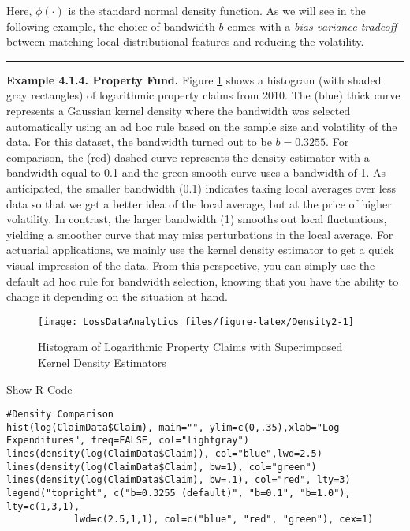 \documentclass[]{book}
\theoremstyle{definition}
\theoremstyle{definition}
\theoremstyle{definition}
\theoremstyle{remark}
\begin{document}
Here, \(\phi(\cdot)\) is the standard normal density function. As we
will see in the following example, the choice of bandwidth \(b\) comes
with a \emph{bias-variance tradeoff} between matching local
distributional features and reducing the volatility.

\begin{center}\rule{0.5\linewidth}{\linethickness}\end{center}

\textbf{Example 4.1.4. Property Fund.} Figure \ref{fig:Density2} shows a
histogram (with shaded gray rectangles) of logarithmic property claims
from 2010. The (blue) thick curve represents a Gaussian kernel density
where the bandwidth was selected automatically using an ad hoc rule
based on the sample size and volatility of the data. For this dataset,
the bandwidth turned out to be \(b=0.3255\). For comparison, the (red)
dashed curve represents the density estimator with a bandwidth equal to
0.1 and the green smooth curve uses a bandwidth of 1. As anticipated,
the smaller bandwidth (0.1) indicates taking local averages over less
data so that we get a better idea of the local average, but at the price
of higher volatility. In contrast, the larger bandwidth (1) smooths out
local fluctuations, yielding a smoother curve that may miss
perturbations in the local average. For actuarial applications, we
mainly use the kernel density estimator to get a quick visual impression
of the data. From this perspective, you can simply use the default ad
hoc rule for bandwidth selection, knowing that you have the ability to
change it depending on the situation at hand.

\begin{figure}

{\centering \texttt{[image: LossDataAnalytics\_files/figure-latex/Density2-1]} 

}

\caption{Histogram of Logarithmic Property Claims with Superimposed Kernel Density Estimators}\label{fig:Density2}
\end{figure}

Show R Code

\hypertarget{togglekpdf}{}
\begin{verbatim}
#Density Comparison
hist(log(ClaimData$Claim), main="", ylim=c(0,.35),xlab="Log Expenditures", freq=FALSE, col="lightgray")
lines(density(log(ClaimData$Claim)), col="blue",lwd=2.5)
lines(density(log(ClaimData$Claim), bw=1), col="green")
lines(density(log(ClaimData$Claim), bw=.1), col="red", lty=3)
legend("topright", c("b=0.3255 (default)", "b=0.1", "b=1.0"), lty=c(1,3,1),
            lwd=c(2.5,1,1), col=c("blue", "red", "green"), cex=1)
\end{verbatim}
\end{document}
